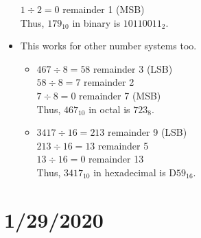 \documentclass[10pt,a4paper]{article}
\begin{document}
\begin{itemize}
$1\div2=0$ remainder 1 (MSB)\\
Thus, $179_{10}$ in binary is $10110011_{2}$.
\item This works for other number systems too.
\begin{itemize}
\item $467\div8=58$ remainder 3 (LSB)\\
$58\div8=7$ remainder 2\\
$7\div8=0$ remainder 7 (MSB)\\
Thus, $467_{10}$ in octal is $723_{8}$. 
\item $3417\div16=213$ remainder 9 (LSB)\\
$213\div16=13$ remainder 5\\
$13\div16=0$ remainder 13\\
Thus, $3417_{10}$ in hexadecimal is D$59_{16}$. 
\end{itemize}
\end{itemize}
\section{1/29/2020}
\end{document}
